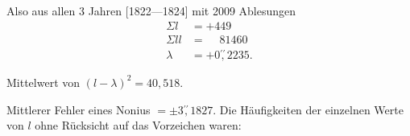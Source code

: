 \par\noindent\hspace*{\parindent}Also aus allen 3 Jahren [1822---1824] mit 2009 Ablesungen
\[
\begin{aligned}
\Sigma l&=+449\\
\Sigma ll&=\phantom{+}81460\\
\lambda&=+0\overset{\prime\prime}{,}2235.
\end{aligned}
\]
\par\noindent\hspace*{\parindent}Mittelwert von $(l-\lambda)^2=40{,}518$.
\par\noindent\hspace*{\parindent}Mittlerer Fehler eines Nonius $=\pm3\overset{\prime\prime}{,}1827$. Die Häufigkeiten der einzelnen Werte von $l$ ohne Rücksicht auf das Vorzeichen waren:

